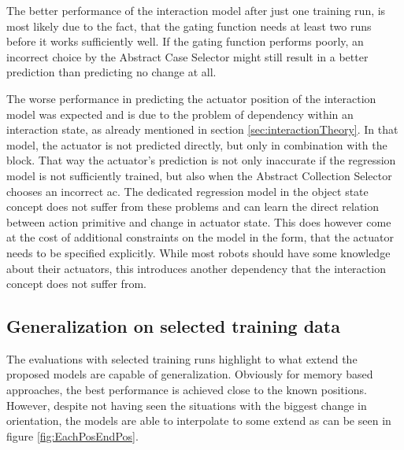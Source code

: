 The better performance of the interaction model after just one training run, is most likely due to the fact, that the gating function needs at least two runs before it works sufficiently well. If the gating function performs poorly, an incorrect choice by the Abstract Case Selector might still result in a better prediction than predicting no change at all.


The worse performance in predicting the actuator position of the interaction model was expected and is due to the problem of dependency within an interaction state, as already mentioned in section \ref{sec:interactionTheory}. In that model, the actuator is not predicted directly, but only in combination with the block. That way the actuator's prediction is not only inaccurate if the regression model is not sufficiently trained, but also when the Abstract Collection Selector chooses an incorrect \gls{ac}. The dedicated regression model in the object state concept does not suffer from these problems and can learn the direct relation between action primitive and change in actuator state. This does however come at the cost of additional constraints on the model in the form, that the actuator needs to be specified explicitly. While most robots should have some knowledge about their actuators, this introduces another dependency that the interaction concept does not suffer from.

\subsection{Generalization on selected training data}

The evaluations with selected training runs highlight to what extend the proposed models are capable of generalization. Obviously for memory based approaches, the best performance is achieved close to the known positions. However, despite not having seen the situations with the biggest change in orientation, the models are able to interpolate to some extend as can be seen in figure \ref{fig:EachPosEndPos}.

